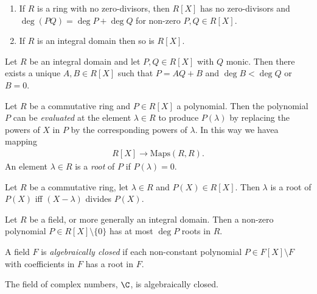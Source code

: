 \documentclass{article}
\begin{document}
\begin{lemma}
	\begin{enumerate}
		\item If $R$ is a ring with no zero-divisors, then $R[X]$ has no zero-divisors
		      and $\deg(PQ)=\deg P + \deg Q$ for non-zero $P,Q\in R[X]$.
		\item If $R$ is an integral domain then so is $R[X]$.
	\end{enumerate}
\end{lemma}

\begin{theorem}[Notes 3.3.4]
	Let $R$ be an integral domain and let $P,Q\in R[X]$ with $Q$ monic. Then there exists
	a unique $A,B\in R[X]$ such that $P=AQ+B$ and $\deg B<\deg Q$ or $B=0$.
\end{theorem}

\begin{definition}
	Let $R$ be a commutative ring and $P\in R[X]$ a polynomial. Then the polynomial $P$
	can be \emph{evaluated} at the element $\lambda\in R$ to produce $P(\lambda)$
	by replacing the powers of $X$ in $P$ by the corresponding powers of $\lambda$.
	In this way we havea mapping
	\begin{align*}
		R[X] \to \text{Maps}(R,R).
	\end{align*}
	An element $\lambda\in R$ is a \emph{root} of $P$ if $P(\lambda) = 0$.
\end{definition}

\begin{proposition}[Notes 3.3.9]
	Let $R$ be a commutative ring, let $\lambda\in R$ and $P(X)\in R[X]$. Then $\lambda$
	is a root of $P(X)$ iff $(X-\lambda)$ divides $P(X)$.
\end{proposition}

\begin{theorem}[Notes 3.3.10]
	Let $R$ be a field, or more generally an integral domain. Then a non-zero polynomial
	$P\in R[X]\setminus\{0\}$ has at most $\deg P$ roots in $R$.
\end{theorem}

\begin{definition}
	A field $F$ is \emph{algebraically closed} if each non-constant polynomial $P\in F[X]\setminus F$
	with coefficients in $F$ has a root in $F$.
\end{definition}

\begin{theorem}
	The field of complex numbers, $\C$, is algebraically closed.
\end{theorem}
\end{document}
